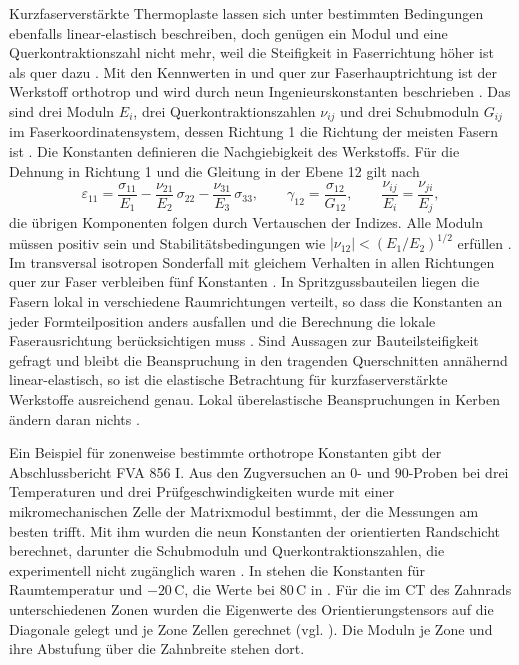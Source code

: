 Kurzfaserverstärkte Thermoplaste lassen sich unter bestimmten Bedingungen ebenfalls linear-elastisch beschreiben, doch genügen ein Modul und eine Querkontraktionszahl nicht mehr, weil die Steifigkeit in Faserrichtung höher ist als quer dazu \cite[S.~75]{Sto18}. Mit den Kennwerten in und quer zur Faserhauptrichtung ist der Werkstoff orthotrop und wird durch neun Ingenieurskonstanten beschrieben \cite[S.~75]{Sto18}. Das sind drei Moduln $E_{i}$, drei Querkontraktionszahlen $\nu_{ij}$ und drei Schubmoduln $G_{ij}$ im Faserkoordinatensystem, dessen Richtung 1 die Richtung der meisten Fasern ist \cite[S.~75]{Sto18}. Die Konstanten definieren die Nachgiebigkeit des Werkstoffs. Für die Dehnung in Richtung 1 und die Gleitung in der Ebene 12 gilt nach \cite{AbaqusLinElast25}
\begin{equation}
    \varepsilon_{11} = \frac{\sigma_{11}}{E_{1}} - \frac{\nu_{21}}{E_{2}}\,\sigma_{22} - \frac{\nu_{31}}{E_{3}}\,\sigma_{33} , \qquad
    \gamma_{12} = \frac{\sigma_{12}}{G_{12}} , \qquad
    \frac{\nu_{ij}}{E_{i}} = \frac{\nu_{ji}}{E_{j}} ,
    \label{eq:orthotrop}
\end{equation}
die übrigen Komponenten folgen durch Vertauschen der Indizes. Alle Moduln müssen positiv sein und Stabilitätsbedingungen wie $|\nu_{12}| < (E_{1}/E_{2})^{1/2}$ erfüllen \cite{AbaqusLinElast25}. Im transversal isotropen Sonderfall mit gleichem Verhalten in allen Richtungen quer zur Faser verbleiben fünf Konstanten \cite[S.~76]{Sto18}. In Spritzgussbauteilen liegen die Fasern lokal in verschiedene Raumrichtungen verteilt, so dass die Konstanten an jeder Formteilposition anders ausfallen und die Berechnung die lokale Faserausrichtung berücksichtigen muss \cite[S.~39 und 75]{Sto18}. Sind Aussagen zur Bauteilsteifigkeit gefragt und bleibt die Beanspruchung in den tragenden Querschnitten annähernd linear-elastisch, so ist die elastische Betrachtung für kurzfaserverstärkte Werkstoffe ausreichend genau. Lokal überelastische Beanspruchungen in Kerben ändern daran nichts \cite[S.~61 bis 62]{Sto18}.

Ein Beispiel für zonenweise bestimmte orthotrope Konstanten gibt der Abschlussbericht FVA 856 I. Aus den Zugversuchen an $0$\textdegree- und $90$\textdegree-Proben bei drei Temperaturen und drei Prüfgeschwindigkeiten wurde mit einer mikromechanischen Zelle der Matrixmodul bestimmt, der die Messungen am besten trifft. Mit ihm wurden die neun Konstanten der orientierten Randschicht berechnet, darunter die Schubmoduln und Querkontraktionszahlen, die experimentell nicht zugänglich waren \cite[S.~21 bis 22]{FVA856-I}. In  stehen die Konstanten für Raumtemperatur und $-20$\,\textdegree C, die Werte bei $80$\,\textdegree C in . Für die im CT des Zahnrads unterschiedenen Zonen wurden die Eigenwerte des Orientierungstensors auf die Diagonale gelegt und je Zone Zellen gerechnet (vgl. ). Die Moduln je Zone und ihre Abstufung über die Zahnbreite stehen dort.

